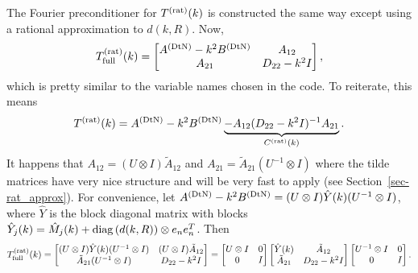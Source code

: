 The Fourier preconditioner for $T^{(\text{rat})}(k)$ is constructed the same way except
using a rational approximation to $d(k,R)$. 
Now,
\begin{align*}
 T^{(\text{rat})}_{\text{full}}(k) 
 = 
 \begin{bmatrix} A^{(\text{DtN})} - k^2 B^{(\text{DtN})} & A_{12} \\
                 A_{21}            & D_{22} - k^2 I
 \end{bmatrix},
\end{align*}
which is pretty similar to the variable names chosen in the code.
To reiterate, this means
\begin{align*}
 T^{(\text{rat})}(k) 
 =
 A^{(\text{DtN})} - k^2 B^{(\text{DtN})} 
 \underbrace{
 - A_{12}(D_{22} - k^2 I)^{-1} A_{21}
 }_{C^{(\text{rat})}(k)}.
\end{align*}
It happens that $A_{12} = (U \otimes I) \tilde{A}_{12}$ and
$A_{21} = \tilde{A}_{21}(U^{-1} \otimes I)$ 
where the tilde matrices have very nice structure and will be very
fast to apply (see Section~\ref{sec-rat_approx}). For convenience, let
$A^{(\text{DtN})} - k^2 B^{(\text{DtN})} = (U \otimes I)\hat{Y}(k) (U^{-1} \otimes I)$,
where $\hat{Y}$ is the block diagonal matrix with blocks
$\hat{Y}_j(k) = \hat{M}_j(k) + \operatorname{diag}\left(d(k,R)\right)\otimes e_ne_n^T$.
Then
\begin{align*}
 T^{(\text{rat})}_{\text{full}}(k) =
  \begin{bmatrix}
   (U \otimes I)\hat{Y}(k)(U^{-1}\otimes I) &
   (U \otimes I) \tilde{A}_{12} \\
   \tilde{A}_{21} (U^{-1} \otimes I) &
   D_{22} - k^2 I
  \end{bmatrix} =
  \begin{bmatrix}U \otimes I & 0 \\ 0 & I\end{bmatrix}
  \begin{bmatrix}
   \hat{Y}(k) & \tilde{A}_{12} \\
   \tilde{A}_{21} & D_{22} - k^2 I
  \end{bmatrix}
  \begin{bmatrix}U^{-1} \otimes I & 0 \\ 0 & I\end{bmatrix}.
\end{align*}

